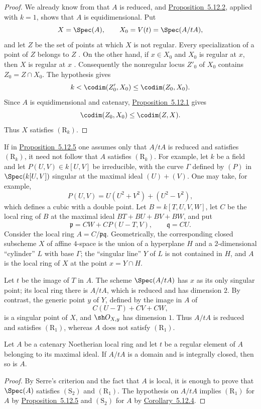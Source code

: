 \begin{proof}
We already know from  that $A$ is reduced, and
{\hyperref[IV.5.12.2]{Proposition~5.12.2}}, applied with $k=1$, shows that $A$ is
equidimensional.  Put
\[
  X=\Spec(A),\qquad X_0=V(t)=\Spec(A/tA),
\]
and let $Z$ be the set of points at which $X$ is not regular.
Every specialization of a point of $Z$ belongs to $Z$
.  On the other hand, if $x\in X_0$ and $X_0$
is regular at $x$, then $X$ is regular at $x$
.  Consequently the nonregular locus $Z'_0$
of $X_0$ contains $Z_0=Z\cap X_0$.  The hypothesis gives
\[
  k<\codim(Z'_0,X_0)\leq\codim(Z_0,X_0).
\]
Since $A$ is equidimensional and catenary, {\hyperref[IV.5.12.1]{Proposition~5.12.1}}
gives
\[
  \codim(Z_0,X_0)\leq\codim(Z,X).
\]
Thus $X$ satisfies $(\mathrm R_k)$.
\end{proof}

\begin{remark}[5.12.6]
\label{IV.5.12.6}
If in {\hyperref[IV.5.12.5]{Proposition~5.12.5}} one assumes only that $A/tA$ is reduced
and satisfies $(\mathrm R_k)$, it need not follow that $A$
satisfies $(\mathrm R_k)$.  For example, let $k$ be a field and
let $P(U,V)\in k[U,V]$ be irreducible, with the curve $\Gamma$
defined by $(P)$ in $\Spec(k[U,V])$ singular at the maximal ideal
$(U)+(V)$.  One may take, for example,
\[
  P(U,V)=U(U^2+V^2)+(U^2-V^2),
\]
which defines a cubic with a double point.  Let
$B=k[T,U,V,W]$, let $C$ be the local ring of $B$ at the maximal
ideal $BT+BU+BV+BW$, and put
\[
  \mathfrak p=CW+CP(U-T,V),\qquad \mathfrak q=CU.
\]
Consider the local ring $A=C/\mathfrak p\mathfrak q$.
Geometrically, the corresponding closed subscheme $X$ of affine
$4$-space is the union of a hyperplane $H$ and a
$2$-dimensional ``cylinder'' $L$ with base $\Gamma$; the
``singular line'' $Y$ of $L$ is not contained in $H$, and $A$ is
the local ring of $X$ at the point $x=Y\cap H$.

Let $t$ be the image of $T$ in $A$.  The scheme
$\Spec(A/tA)$ has $x$ as its only singular point; its local ring
there is $A/tA$, which is reduced and has dimension $2$.  By
contrast, the generic point $y$ of $Y$, defined by the image in
$A$ of
\[
  C(U-T)+CV+CW,
\]
is a singular point of $X$, and $\sh O_{X,y}$ has dimension $1$.
Thus $A/tA$ is reduced and satisfies $(\mathrm R_1)$, whereas
$A$ does not satisfy $(\mathrm R_1)$.
\end{remark}


\begin{corollary}[5.12.7]
\label{IV.5.12.7}
Let $A$ be a catenary Noetherian local ring and let $t$ be a
regular element of $A$ belonging to its maximal ideal.  If
$A/tA$ is a domain and is integrally closed, then so is $A$.
\end{corollary}

\begin{proof}
By Serre's criterion  and the fact that $A$ is
local, it is enough to prove that $\Spec(A)$ satisfies
$(\mathrm S_2)$ and $(\mathrm R_1)$.  The hypothesis on $A/tA$
implies $(\mathrm R_1)$ for $A$ by {\hyperref[IV.5.12.5]{Proposition~5.12.5}} and
$(\mathrm S_2)$ for $A$ by {\hyperref[IV.5.12.4]{Corollary~5.12.4}}.
\end{proof}
